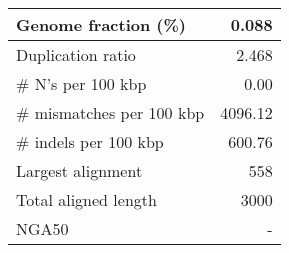 \documentclass[12pt,a4paper]{article}
\begin{document}
\begin{table}[ht]
\begin{center}
\begin{tabular}{|l*{1}{|r}|}
Genome fraction (\%) & 0.088 \\ \hline
Duplication ratio & 2.468 \\ \hline
\# N's per 100 kbp & 0.00 \\ \hline
\# mismatches per 100 kbp & 4096.12 \\ \hline
\# indels per 100 kbp & 600.76 \\ \hline
Largest alignment & 558 \\ \hline
Total aligned length & 3000 \\ \hline
NGA50 & - \\ \hline
\end{tabular}
\end{center}
\end{table}
\end{document}
